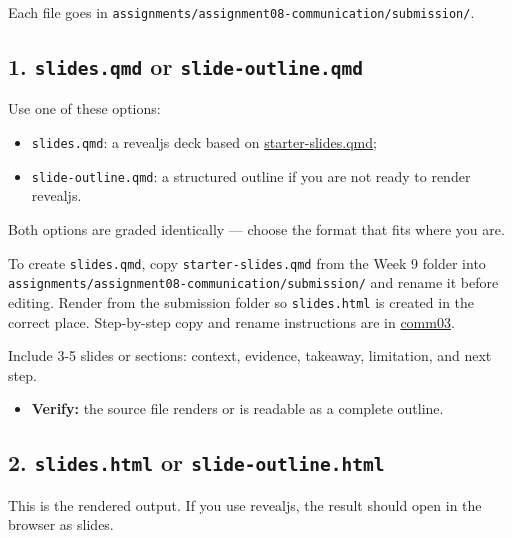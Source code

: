 \documentclass[
  letterpaper,
  DIV=11,
  numbers=noendperiod,
  oneside]{scrreprt}
\providecommand{\tightlist}{%
  \setlength{\itemsep}{0pt}\setlength{\parskip}{0pt}}
\begin{document}

Each file goes in
\texttt{assignments/assignment08-communication/submission/}.

\subsection*{\texorpdfstring{1. \texttt{slides.qmd} or
\texttt{slide-outline.qmd}}{1. slides.qmd or slide-outline.qmd}}\label{slides.qmd-or-slide-outline.qmd}

Use one of these options:

\begin{itemize}
\tightlist
\item
  \texttt{slides.qmd}: a revealjs deck based on
  \url{starter-slides.qmd};
\item
  \texttt{slide-outline.qmd}: a structured outline if you are not ready
  to render revealjs.
\end{itemize}

Both options are graded identically --- choose the format that fits
where you are.

To create \texttt{slides.qmd}, copy \texttt{starter-slides.qmd} from the
Week 9 folder into
\texttt{assignments/assignment08-communication/submission/} and rename
it before editing. Render from the submission folder so
\texttt{slides.html} is created in the correct place. Step-by-step copy
and rename instructions are in \hyperref[revealjs-starter]{comm03}.

Include 3-5 slides or sections: context, evidence, takeaway, limitation,
and next step.

\begin{itemize}
\tightlist
\item
  \textbf{Verify:} the source file renders or is readable as a complete
  outline.
\end{itemize}

\subsection*{\texorpdfstring{2. \texttt{slides.html} or
\texttt{slide-outline.html}}{2. slides.html or slide-outline.html}}\label{slides.html-or-slide-outline.html}

This is the rendered output. If you use revealjs, the result should open
in the browser as slides.
\end{document}
